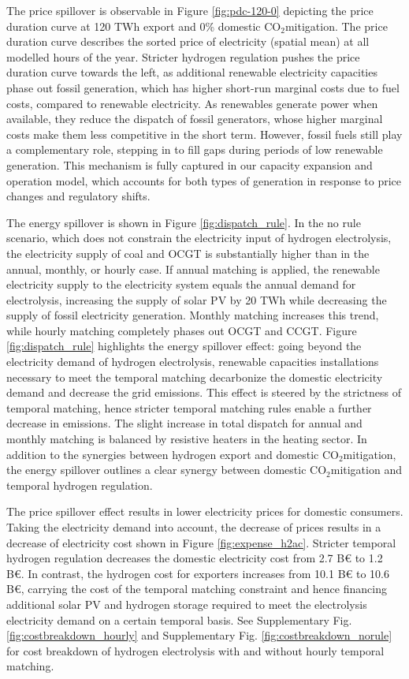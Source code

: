 \documentclass[5p,numafflabel]{elsarticle}
\newcommand{\co}{\ce{CO2}~}
\def\co{CO${}_2${\:}}
\begin{document}
The price spillover is observable in Figure \ref{fig:pdc-120-0} depicting the price duration curve at 120 TWh export and 0\% domestic \co mitigation. The price duration curve describes the sorted price of electricity (spatial mean) at all modelled hours of the year.
Stricter hydrogen regulation pushes the price duration curve towards the left, as additional renewable electricity capacities phase out fossil generation, which has higher short-run marginal costs due to fuel costs, compared to renewable electricity.
As renewables generate power when available, they reduce the dispatch of fossil generators, whose higher marginal costs make them less competitive in the short term. However, fossil fuels still play a complementary role, stepping in to fill gaps during periods of low renewable generation. This mechanism is fully captured in our capacity expansion and operation model, which accounts for both types of generation in response to price changes and regulatory shifts.


The energy spillover is shown in Figure \ref{fig:dispatch_rule}. In the no rule scenario, which does not constrain the electricity input of hydrogen electrolysis, the electricity supply of coal and OCGT is substantially higher than in the annual, monthly, or hourly case. If annual matching is applied, the renewable electricity supply to the electricity system equals the annual demand for electrolysis, increasing the supply of solar PV by 20 TWh while decreasing the supply of fossil electricity generation. 
Monthly matching increases this trend, while hourly matching completely phases out OCGT and CCGT. Figure \ref{fig:dispatch_rule} highlights the energy spillover effect: going beyond the electricity demand of hydrogen electrolysis, renewable capacities installations necessary to meet the temporal matching decarbonize the domestic electricity demand and decrease the grid emissions. This effect is steered by the strictness of temporal matching, hence stricter temporal matching rules enable a further decrease in emissions.
The slight increase in total dispatch for annual and monthly matching is balanced by resistive heaters in the heating sector.
In addition to the synergies between hydrogen export and domestic \co mitigation, the energy spillover outlines a clear synergy between domestic \co mitigation and temporal hydrogen regulation.



The price spillover effect results in lower electricity prices for domestic consumers. Taking the electricity demand into account, the decrease of prices results in a decrease of electricity cost shown in 
Figure \ref{fig:expense_h2ac}. Stricter temporal hydrogen regulation decreases the domestic electricity cost from 2.7 B€ to 1.2 B€. In contrast, the hydrogen cost for exporters increases from 10.1 B€ to 10.6 B€, carrying the cost of the temporal matching constraint and hence financing additional solar PV and hydrogen storage required to meet the electrolysis electricity demand on a certain temporal basis. See Supplementary Fig. \ref{fig:costbreakdown_hourly} and Supplementary Fig. \ref{fig:costbreakdown_norule} for cost breakdown of hydrogen electrolysis with and without hourly temporal matching.
\end{document}
